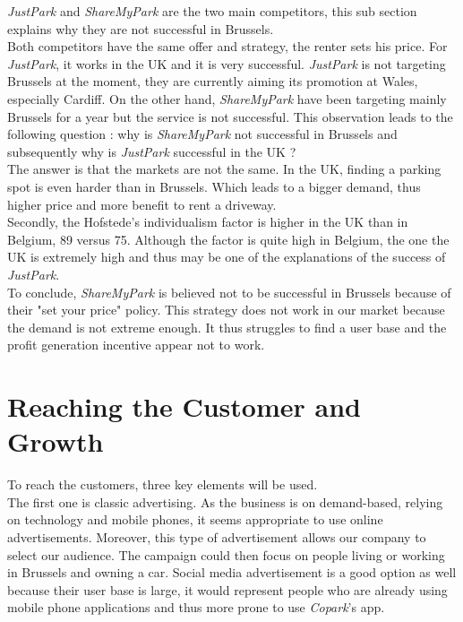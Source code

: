 \documentclass[12pt,a4paper,oneside]{book}
\newcommand{\bp}{\textit{Copark}}
\begin{document}
\textit{JustPark} and \textit{ShareMyPark} are the two main competitors, this sub section explains why they are not successful in Brussels.\\

Both competitors have the same offer and strategy, the renter sets his price. For \textit{JustPark}, it works in the UK and it is very successful. \textit{JustPark} is not targeting Brussels at the moment, they are currently aiming its promotion at Wales, especially Cardiff. On the other hand, \textit{ShareMyPark} have been targeting mainly Brussels for a year but the service is not successful. This observation leads to the following question : why is \textit{ShareMyPark} not successful in Brussels and subsequently why is \textit{JustPark} successful in the UK ?\\

The answer is that the markets are not the same. In the UK, finding a parking spot is even harder than in Brussels. Which leads to a bigger demand, thus higher price and more benefit to rent a driveway.\\

Secondly, the Hofstede's individualism factor is higher in the UK than in Belgium, 89 versus 75.\cite{hukbe} Although the factor is quite high in Belgium, the one the UK is extremely high and thus may be one of the explanations of the success of \textit{JustPark}.\\

To conclude, \textit{ShareMyPark} is believed not to be successful in Brussels because of their "set your price" policy. This strategy does not work in our market because the demand is not extreme enough. It thus struggles to find a user base and the profit generation incentive appear not to work.

\section{Reaching the Customer and Growth}
To reach the customers, three key elements will be used.\\

The first one is classic advertising. As the business is on demand-based, relying on technology and mobile phones, it seems appropriate to use online advertisements. Moreover, this type of advertisement allows our company to select our audience. The campaign could then focus on people living or working in Brussels and owning a car. Social media advertisement is a good option as well because their user base is large, it would represent people who are already using mobile phone applications and thus more prone to use \bp{}'s app.\\
\end{document}
